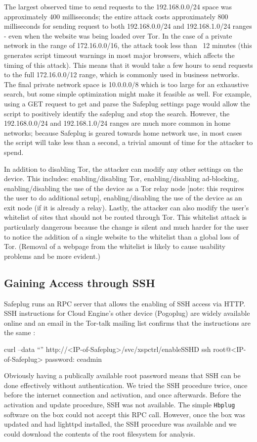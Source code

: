 The largest observed time to send requests to the 192.168.0.0/24 space was approximately 400 milliseconds; the entire attack costs approximately 800 milliseconds for sending request to both 192.168.0.0/24 and 192.168.1.0/24 ranges - even when the website was being loaded over Tor.  In the case of a private network in the range of 172.16.0.0/16, the attack took less than ~12 minutes (this generates script timeout warnings in most major browsers, which affects the timing of this attack).  This means that it would take a few hours to send requests to the full 172.16.0.0/12 range, which is commonly used in business networks.  The final private network space is 10.0.0.0/8 which is too large for an exhaustive search, but some simple optimization might make it feasible as well.  For example, using a GET request to get and parse the Safeplug settings page would allow the script to positively identify the safeplug and stop the search.  However, the 192.168.0.0/24 and 192.168.1.0/24 ranges are much more common in home networks; because Safeplug is geared towards home network use, in most cases the script will take less than a second, a trivial amount of time for the attacker to spend.  

In addition to disabling Tor, the attacker can modify any other settings on the device.  This includes: enabling/disabling Tor, enabling/disabling ad-blocking, enabling/disabling the use of the device as a Tor relay node [note: this requires the user to do additional setup], enabling/disabling the use of the device as an exit node (if it is already a relay).  Lastly, the attacker can also modify the user's whitelist of sites that should not be routed through Tor.  This whitelist attack is particularly dangerous because the change is silent and much harder for the user to notice the addition of a single website to the whitelist than a global loss of Tor.  (Removal of a webpage from the whitelist is likely to cause usability problems and be more evident.)

\subsection{Gaining Access through SSH}
\label{sec:SSH}
    Safeplug runs an RPC server that allows the enabling of SSH access via HTTP. SSH instructions for Cloud Engine's other device (Pogoplug) are widely available online and an email in the Tor-talk mailing list confirms that the instructions are the same \cite{ceadmin}:
\begin{fileName}
curl --data ``'' http://<IP-of-Safeplug>/svc/xspctrl/enableSSHD
ssh root@<IP-of-Safeplug>
password: ceadmin
\end{fileName}

Obviously having a publically available root password means that SSH can be done effectively without authentication.  We tried the SSH procedure twice, once before the internet connection and activation, and once afterwards.  Before the activation and update procedure, SSH was not available.  The simple \verb!Hbplug! software on the box could not accept this RPC call.  However, once the box was updated and had lighttpd installed, the SSH procedure was available and we could download the contents of the root filesystem for analysis.
